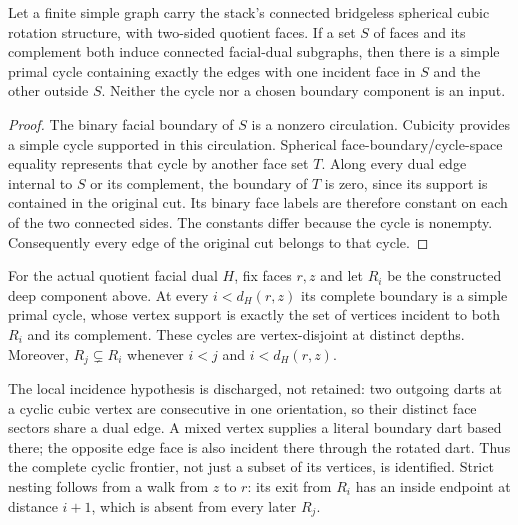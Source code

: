 \begin{theorem}
Let a finite simple graph carry the stack's connected bridgeless spherical
cubic rotation structure, with two-sided quotient faces.  If a set $S$ of
faces and its complement both induce connected facial-dual subgraphs,
then there is a simple primal cycle containing exactly the edges with one
incident face in $S$ and the other outside $S$.  Neither the cycle nor a
chosen boundary component is an input.
\end{theorem}

\begin{proof}
The binary facial boundary of $S$ is a nonzero circulation.  Cubicity
provides a simple cycle supported in this circulation.  Spherical
face-boundary/cycle-space equality represents that cycle by another face
set $T$.  Along every dual edge internal to $S$ or its complement, the
boundary of $T$ is zero, since its support is contained in the original
cut.  Its binary face labels are therefore constant on each of the two
connected sides.  The constants differ because the cycle is nonempty.
Consequently every edge of the original cut belongs to that cycle.
\end{proof}

\begin{theorem}
For the actual quotient facial dual $H$, fix faces $r,z$ and let $R_i$ be
the constructed deep component above.  At every $i<d_H(r,z)$ its complete
boundary is a simple primal cycle, whose vertex support is exactly the set
of vertices incident to both $R_i$ and its complement.  These cycles are
vertex-disjoint at distinct depths.  Moreover, $R_j\subsetneq R_i$ whenever
$i<j$ and $i<d_H(r,z)$.
\end{theorem}

The local incidence hypothesis is discharged, not retained: two outgoing
darts at a cyclic cubic vertex are consecutive in one orientation, so
their distinct face sectors share a dual edge.  A mixed vertex supplies a
literal boundary dart based there; the opposite edge face is also incident
there through the rotated dart.  Thus the complete cyclic frontier, not
just a subset of its vertices, is identified.  Strict nesting follows from
a walk from $z$ to $r$: its exit from $R_i$ has an inside endpoint at
distance $i+1$, which is absent from every later $R_j$.

